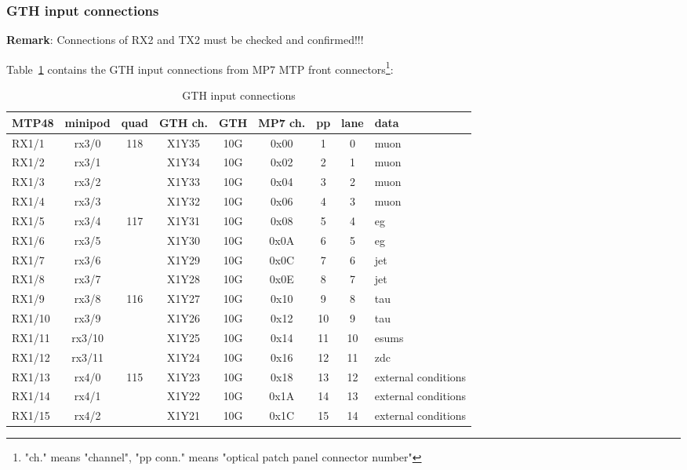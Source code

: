 \subsubsection{GTH input connections}\label{sec:app:gth_i_conn}

\textbf{Remark}:
Connections of RX2 and TX2 must be checked and confirmed!!!

Table~\ref{tab:app:gth_i_conn} contains the GTH input connections from MP7 MTP front connectors\footnote{"ch." means "channel", "pp conn." means "optical patch panel connector number"}:

\begin{longtable}{|l|c|c|c|c|c|c|c|l|}
\caption{GTH input connections}
    \label{tab:app:gth_i_conn}\\
\hline
\textbf{MTP48}& \textbf{minipod}& \textbf{quad}& \textbf{GTH ch.}& \textbf{GTH}& \textbf{MP7 ch.} &\textbf{pp}& \textbf{lane}& \textbf{data}\\
\hline
\hline
\endhead
RX1/1  & rx3/0  & 118 & X1Y35 & 10G & 0x00 & 1  & 0  & muon\\\hline
RX1/2  & rx3/1  &     & X1Y34 & 10G & 0x02 & 2  & 1  & muon\\\hline
RX1/3  & rx3/2  &     & X1Y33 & 10G & 0x04 & 3  & 2  & muon\\\hline
RX1/4  & rx3/3  &     & X1Y32 & 10G & 0x06 & 4  & 3  & muon\\\hline
RX1/5  & rx3/4  & 117 & X1Y31 & 10G & 0x08 & 5  & 4  & eg\\\hline
RX1/6  & rx3/5  &     & X1Y30 & 10G & 0x0A & 6  & 5  & eg\\\hline
RX1/7  & rx3/6  &     & X1Y29 & 10G & 0x0C & 7  & 6  & jet\\\hline
RX1/8  & rx3/7  &     & X1Y28 & 10G & 0x0E & 8  & 7  & jet\\\hline
RX1/9  & rx3/8  & 116 & X1Y27 & 10G & 0x10 & 9  & 8  & tau\\\hline
RX1/10 & rx3/9  &     & X1Y26 & 10G & 0x12 & 10 & 9  & tau\\\hline
RX1/11 & rx3/10 &     & X1Y25 & 10G & 0x14 & 11 & 10 & esums\\\hline
RX1/12 & rx3/11 &     & X1Y24 & 10G & 0x16 & 12 & 11 & zdc\\\hline
RX1/13 & rx4/0  & 115 & X1Y23 & 10G & 0x18 & 13 & 12 & external conditions\\\hline
RX1/14 & rx4/1  &     & X1Y22 & 10G & 0x1A & 14 & 13 & external conditions\\\hline
RX1/15 & rx4/2  &     & X1Y21 & 10G & 0x1C & 15 & 14 & external conditions\\\hline

\end{longtable}
